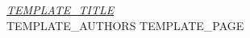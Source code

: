 \item \hyperlink{page.TEMPLATE_PAGE}{\emph{TEMPLATE_TITLE}}\\ TEMPLATE_AUTHORS \dotfill TEMPLATE_PAGE

